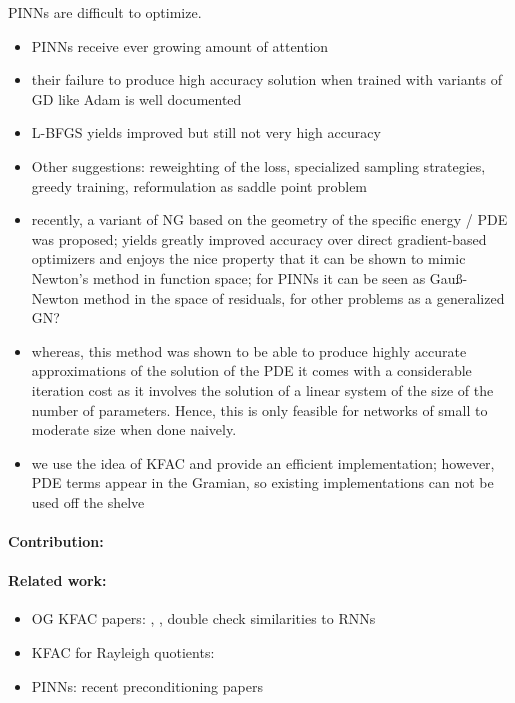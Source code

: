 PINNs are difficult to optimize.
\begin{itemize}
    \item PINNs receive ever growing amount of attention
    \item their failure to produce high accuracy solution when trained with variants of GD like Adam is well documented
    \item L-BFGS yields improved but still not very high accuracy
    \item Other suggestions: reweighting of the loss, specialized sampling strategies, greedy training, reformulation as saddle point problem
    \item recently, a variant of NG based on the geometry of the specific energy / PDE was proposed; yields greatly improved accuracy over direct gradient-based optimizers and enjoys the nice property that it can be shown to mimic Newton's method in function space; for PINNs it can be seen as Gau\ss-Newton method in the space of residuals, for other problems as a generalized GN?
    \item whereas, this method was shown to be able to produce highly accurate approximations of the solution of the PDE it comes with a considerable iteration cost as it involves the solution of a linear system of the size of the number of parameters. Hence, this is only feasible for networks of small to moderate size when done naively.
    \item we use the idea of KFAC and provide an efficient implementation; however, PDE terms appear in the Gramian, so existing implementations can not be used off the shelve 
\end{itemize}

\paragraph{Contribution:} 

\paragraph{Related work:}
\begin{itemize}
\item OG KFAC papers: \cite{martens2015optimizing}, \cite{martens2018kroneckerfactored}, double check similarities to RNNs
\item KFAC for Rayleigh quotients:
\item PINNs: recent preconditioning papers
\end{itemize}


